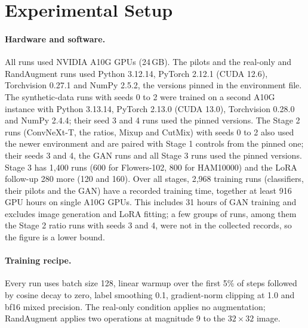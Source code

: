 \section{Experimental Setup}
\label{sec:setup}


\paragraph{Hardware and software.}
All runs used NVIDIA A10G GPUs (24\,GB). The pilots and the real-only and RandAugment runs used Python 3.12.14, PyTorch 2.12.1 (CUDA 12.6), Torchvision 0.27.1 and NumPy 2.5.2, the versions pinned in the environment file. The synthetic-data runs with seeds 0 to 2 were trained on a second A10G instance with Python 3.13.14, PyTorch 2.13.0 (CUDA 13.0), Torchvision 0.28.0 and NumPy 2.4.4; their seed 3 and 4 runs used the pinned versions.
The Stage 2 runs (ConvNeXt-T, the ratios, Mixup and CutMix) with seeds 0 to 2 also used the newer environment
and are paired with Stage 1 controls from the pinned one; their seeds 3 and 4, the GAN runs and all Stage 3 runs
used the pinned versions. Stage 3 has 1{,}400 runs (600 for Flowers-102, 800 for
HAM10000) and the LoRA follow-up 280 more (120 and 160).
Over all stages, 2{,}968 training runs (classifiers, their pilots and the GAN) have a recorded training time,
together at least 916 GPU hours on single A10G GPUs. This includes 31 hours of GAN training and excludes image
generation and LoRA fitting; a few groups of runs, among them the Stage 2 ratio runs with seeds 3 and 4, were not
in the collected records, so the figure is a lower bound.

\paragraph{Training recipe.}
Every run uses batch size 128, linear warmup over the first 5\% of steps followed by cosine decay to zero, label smoothing 0.1, gradient-norm clipping at 1.0 and bf16 mixed precision. The real-only condition applies no augmentation; RandAugment applies two operations at magnitude 9 to the $32\times32$ image.

